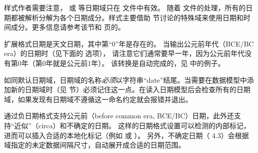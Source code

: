 样式作者需要注意， 或   等日期域只在  文件中有效。
随着  文件的处理，所有的日期都被解析分解为各个日期成分。样式主要借助 节讨论的特殊域来使用日期和时间成分。更多信息请参考该节和 \pageref{aut:bbx:fld:tab1} 页的。

 扩展格式日期是天文日期，其中第“0”年是存在的。
当输出公元前年代（BCE/BC era）的日期时（见下面的  选项），
请注意它们通常要早一年，因为公元前年代没有第0年（第0年就是公元前1年）。
该转换是自动完成的，见 中的例子。

如同默认日期域，日期域的名称\emph{必须}以字符串“date”结尾。当需要在数据模型中添加新的日期域时（见  节）必须记住这一点。\biblatex 在读入日期模型后会检查所有的日期域，如果发现有日期域不遵循这一命名约定就会报错并退出。

 通过负日期格式支持公元前（before common era, BCE/BC）日期，此外还支持“近似”（circa）和不确定的日期。
这样的日期格式设置可以检测的内部标记，进而可以插入合适的本地化标记（例如  或 ）。
另外，不确定日期（ 4.3）会根据 域指定的未定数据间隔尺寸，自动展开成合适的日期范围。


